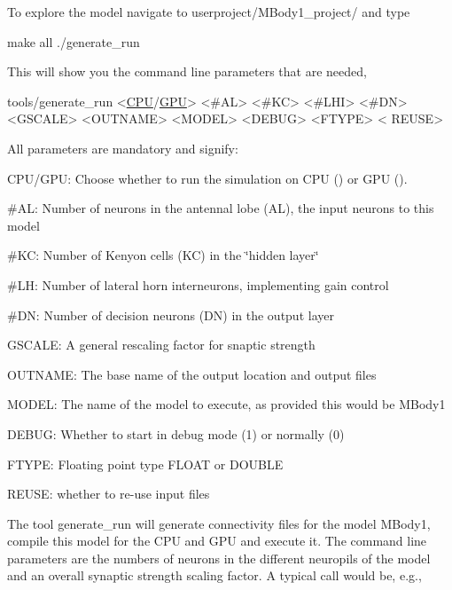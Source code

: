 To explore the model navigate to {\ttfamily userproject/\+M\+Body1\+\_\+project/} and type 
\begin{DoxyCode}
make all
./generate\_run 
\end{DoxyCode}
 This will show you the command line parameters that are needed, 
\begin{DoxyCode}
tools/generate\_run <\hyperlink{modelSpec_8h_ad703205f9a4d4bb6af9c25257c23ce6d}{CPU}/\hyperlink{modelSpec_8h_a39cb9803524b6f3b783344b2f89867b4}{GPU}> <#AL> <#KC> <#LHI> <#DN> <GSCALE> <OUTNAME> <MODEL> <DEBUG> <FTYPE> <
      REUSE>
\end{DoxyCode}
 All parameters are mandatory and signify\+: \begin{DoxyItemize}
\item {\ttfamily C\+P\+U/\+G\+P\+U}\+: Choose whether to run the simulation on C\+P\+U ({}) or G\+P\+U ({}). \item {\ttfamily \#\+A\+L}\+: Number of neurons in the antennal lobe (A\+L), the input neurons to this model \item {\ttfamily \#\+K\+C}\+: Number of Kenyon cells (K\+C) in the \char`\"{}hidden layer\char`\"{} \item {\ttfamily \#\+L\+H}\+: Number of lateral horn interneurons, implementing gain control \item {\ttfamily \#\+D\+N}\+: Number of decision neurons (D\+N) in the output layer \item {\ttfamily G\+S\+C\+A\+L\+E}\+: A general rescaling factor for snaptic strength \item {\ttfamily O\+U\+T\+N\+A\+M\+E}\+: The base name of the output location and output files \item {\ttfamily M\+O\+D\+E\+L}\+: The name of the model to execute, as provided this would be {\ttfamily M\+Body1} \item {\ttfamily D\+E\+B\+U\+G}\+: Whether to start in debug mode (1) or normally (0) \item {\ttfamily F\+T\+Y\+P\+E}\+: Floating point type {\ttfamily F\+L\+O\+A\+T} or {\ttfamily D\+O\+U\+B\+L\+E} \item {\ttfamily R\+E\+U\+S\+E}\+: whether to re-\/use input files\end{DoxyItemize}
The tool generate\+\_\+run will generate connectivity files for the model {\ttfamily M\+Body1}, compile this model for the C\+P\+U and G\+P\+U and execute it. The command line parameters are the numbers of neurons in the different neuropils of the model and an overall synaptic strength scaling factor. A typical call would be, e.\+g., 
